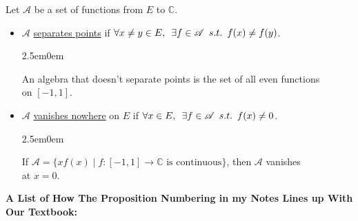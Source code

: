 \documentclass{book}
\newcommand{\exOne}{%
   \color{Purple}%
   \fontsize{14}{16}\selectfont%
}
\newenvironment{myIndent}{%
   \begin{adjustwidth}{2.5em}{0em}%
}{%
   \end{adjustwidth}%
}
\newcommand{\udefine}[1]{{%
   \setulcolor{Red}%
   \setul{0.14em}{0.07em}%
   \ul{#1}%
}}
\newcommand{\suchthat}{ \hspace{0.5em}s.t.\hspace{0.5em}}
\newcommand{\myHS}{ \hspace{0.5em}}
\newcommand{\retTwo}{\hfill\bigbreak}
\begin{document}
Let $\mathscr{A}$ be a set of functions from $E$ to $\mathbb{C}$.\\ [-22pt]
\begin{itemize}
   \item[\hphantom{.}] $\mathscr{A}$ \udefine{separates points} if $\forall x \neq y \in E, \myHS \exists f \in \mathscr{A} \suchthat f(x) \neq f(y)$.
   {\begin{myIndent}\exOne
      An algebra that doesn't separate points is the set of all even functions\\ on $[-1, 1]$.\retTwo
   \end{myIndent}}
   \item[\hphantom{.}] $\mathscr{A}$ \udefine{vanishes nowhere} on $E$ if $\forall x \in E,\myHS \exists f \in \mathscr{A} \suchthat f(x) \neq 0$.
   {\begin{myIndent}\exOne
      If $\mathscr{A} = \{xf(x) \mid f: [-1, 1] \longrightarrow \mathbb{C} \text{ is continuous}\}$, then $\mathscr{A}$ vanishes\\ at $x = 0$.\retTwo
   \end{myIndent}}
\end{itemize}


\newpage
{\huge \color{Black} \textbf{A List of How The Proposition Numbering in my Notes Lines up With Our Textbook:} \retTwo}
\exOne
\end{document}
